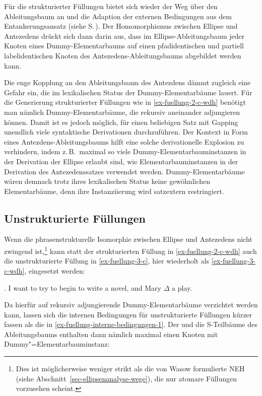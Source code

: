 Für die  strukturierter Füllungen bietet sich wieder der Weg über den Ableitungsbaum an und die Adaption der externen Bedingungen aus dem Entankerungsansatz (siehe S.\,\pageref{sec-deanchoring-extern}). Der Homomorphismus zwischen Ellipse und Antezedens drückt sich dann darin aus, dass im Ellipse-Ableitungsbaum jeder Knoten eines Dummy-Elementarbaums auf einen pfadidentischen und partiell labelidentischen Knoten des Antezedens-Ableitungsbaums abgebildet werden kann.    

Die enge Kopplung an den Ableitungsbaum des Antezdens dämmt zugleich eine Gefahr ein, die im lexikalischen Status der Dummy-Elementarbäume lauert. Für die Generierung strukturierter Füllungen wie in \ref{ex-fuellung-2-c-wdh} benötigt man nämlich Dummy-Elementarbäume, die rekursiv aneinander adjungieren können. Damit ist es jedoch möglich, für einen beliebigen Satz mit Gapping unendlich viele syntaktische Derivationen durchzuführen. Der Kontext in Form eines Antezdens-Ableitungsbaums hilft eine solche derivationelle Explosion zu verhindern, indem z.\,B.\ maximal so viele Dummy-Elementarbauminstanzen in der Derivation der Ellipse erlaubt sind, wie Elementarbauminstanzen in der Derivation des Antezedenssatzes verwendet werden. Dummy-Elementarbäume wären demnach trotz ihres lexikalischen Status keine gewöhnlichen Elementarbäume, denn ihre Instanziierung wird satzextern restringiert.

\subsection{Unstrukturierte Füllungen}

Wenn die phrasenstrukturelle Isomorphie zwischen Ellipse und Antezedens nicht zwingend ist,\footnote{Dies ist möglicherweise weniger strikt als die von Wasow formulierte NEH (siehe Abschnitt~\ref{sec-ellipsenanalyse-wege}), die nur atomare Füllungen vorzusehen scheint.} kann statt der strukturierten Füllung in \ref{ex-fuellung-2-c-wdh} auch die unstrukturierte Füllung in \ref{ex-fuellung-3-c}, hier wiederholt als \ref{ex-fuellung-3-c-wdh}, eingesetzt werden:
  
\ex. I want to try to begin to write a novel, and Mary $\Delta$ a play.\label{ex-fuellung-3-c-wdh}
  
Da hierfür auf rekursiv adjungierende Dummy-Elementarbäume verzichtet werden kann, lassen sich die internen Bedingungen für unstrukturierte Füllungen kürzer fassen als die in \ref{ex-fuellung-interne-bedingungen-1}. Der  und die S-Teilbäume des Ableitungsbaums enthalten dann nämlich maximal einen Knoten mit Dummy"=Elementarbauminstanz:

